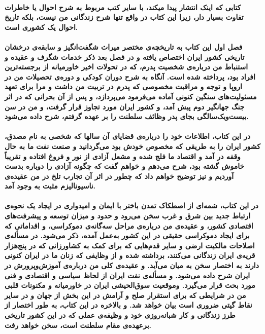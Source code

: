 \paragraph{
	کتابی که اینک انتشار پیدا میکند، با سایر کتب مربوط به شرح احوال یا خاطرات تفاوت بسیار دار، زیرا این کتاب در واقع تنها شرح زندگانی من نیست، بلکه تاریخ احوال یک کشوری است. 
}
\paragraph{
	فصل اول این کتاب به تاریخچه‌ی مختصر میراث شگفت‌انگیز و سابقه‌ی درخشان تاریخی کشور ایران اختصاص یافته و در فصل بعد ذکر خدمات شگرف و عقیده و استنباط من درباره‌ی شخصیت پدرم، که در تحولات اخیر خاورمیانه از برجسته‌ترین افراد بود، پرداخته شده است. آنگاه به شرح دوران کودکی و دوره‌ی تحصیلات من در اروپا و توجه و مراقبت مخصوصی که پدرم در تربیت من داشت و مرا برای تعهد مسئولیت‌های سنگین کنونی آماده می‌فرمود می‌پردازد، و پس از آن بحرانی که در اثر جنگ جهانگیر دوم پیش آمد، و کشور ایران مورد تجاوز قرار گرفت، و من در سن بیست‌و‌یک‌سالگی بجای پدر وظائف سلطنت را بر عهده گرفتم، شرح داده می‌شود.
} 
\paragraph{
	در این کتاب، اطلاعات خود را درباره‌ی قضایای آن سالها که شخصی به نام \gls{مصدق}، کشور ایران را به طریقی که مخصوص خودش بود می‌گردانید و صنعت نفت ما به حال وقفه در آمد و اقتصاد ما فلج شده و مشعل آزادی از نور و فروغ افتاده و تقریباً خاموش گشته بود، شرح می‌دهم و خواهم گفت که چگونه آزادی را دوباره بدست آوردیم و نیز توضیح خواهم داد که چطور در اثر آن تجارب تلخ در من عقیده‌ی ناسیونالیزم مثبت به وجود آمد.  
}
\paragraph{
	در این کتاب، شمه‌ای از اصطکاک تمدن باختر با ایمان و امیدواری در ایجاد یک نحوه‌ی ارتباط جدید بین شرق و غرب سخن می‌رود و حدود و میزان توسعه و پیشرفت‌های اقتصادی کشور، و عقیده‌ی من درباره‌ی مراحل سه‌گانه‌ی دموکراسی، و اقداماتی که برای ایجاد دموکراسی حقیقی در این کشور به‌عمل آمده، ذکر می‌شود. در مسأله‌ی اصلاحات مالکیت ارضی و سایر قدم‌هایی که برای کمک به کشاورزانی که در پنج‌هزار قریه‌ی ایران زندگانی می‌کنند، برداشته شده و از وظایفی که زنان ما در ایران کنونی دارند به اختصار سخن به میان می‌آید. و عقیده‌ی کلی من درباره‌ی آموزش‌و‌پرورش در ایران شرح داده می‌شود. 
	و مسأله‌ی نفت ایران از لحاظ سیاسی و اقتصادی و فنی مورد بحث قرار می‌گیرد. وموقعیت سوق‌الحیشی ایران در خاورمیانه و مکنونات قلبی من در شرایطی که برای استقرار صلح و آرامش در این بخش از جهان و در سایر نقاط گیتی ضروری است بیان خواهد شد. و بالاخره در این کتاب، به طور اختصار از طرز زندگانی و کار شبانه‌روزی خود و وظیفه‌ی عملی که در این کشور تاریخی برعهده‌ی مقام سلطنت است، سخن خواهد رفت.   
}
